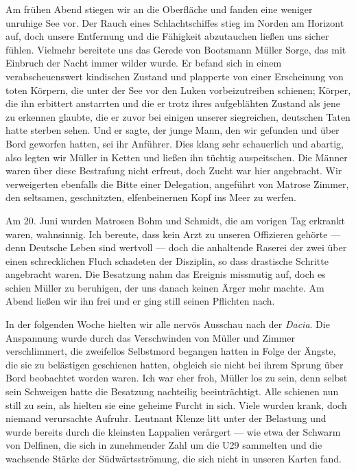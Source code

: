 \documentclass[a4paper]{memoir}
\begin{document}
Am frühen Abend stiegen wir an die Oberfläche und fanden eine weniger unruhige See vor. Der Rauch eines Schlachtschiffes stieg im Norden am Horizont auf, doch unsere Entfernung und die Fähigkeit abzutauchen ließen uns sicher fühlen. Vielmehr bereitete uns das Gerede von Bootsmann Müller Sorge, das mit Einbruch der Nacht immer wilder wurde. Er befand sich in einem verabscheuenswert kindischen Zustand und plapperte von einer Erscheinung von toten Körpern, die unter der See vor den Luken vorbeizutreiben schienen; Körper, die ihn erbittert anstarrten und die er trotz ihres aufgeblähten Zustand als jene zu erkennen glaubte, die er zuvor bei einigen unserer siegreichen, deutschen Taten hatte sterben sehen. Und er sagte, der junge Mann, den wir gefunden und über Bord geworfen hatten, sei ihr Anführer. Dies klang sehr schauerlich und abartig, also legten wir Müller in Ketten und ließen ihn tüchtig auspeitschen. Die Männer waren über diese Bestrafung nicht erfreut, doch Zucht war hier angebracht. Wir verweigerten ebenfalls die Bitte einer Delegation, angeführt von Matrose Zimmer, den seltsamen, geschnitzten, elfenbeinernen Kopf ins Meer zu werfen.

Am 20. Juni wurden Matrosen Bohm und Schmidt, die am vorigen Tag erkrankt waren, wahnsinnig. Ich bereute, dass kein Arzt zu unseren Offizieren gehörte --- denn Deutsche Leben sind wertvoll --- doch die anhaltende Raserei der zwei über einen schrecklichen Fluch schadeten der Disziplin, so dass drastische Schritte angebracht waren. Die Besatzung nahm das Ereignis missmutig auf, doch es schien Müller zu beruhigen, der uns danach keinen Ärger mehr machte. Am Abend ließen wir ihn frei und er ging still seinen Pflichten nach.

In der folgenden Woche hielten wir alle nervös Ausschau nach der \textit{Dacia}. Die Anspannung wurde durch das Verschwinden von Müller und Zimmer verschlimmert, die zweifellos Selbstmord begangen hatten in Folge der Ängste, die sie zu belästigen geschienen hatten, obgleich sie nicht bei ihrem Sprung über Bord beobachtet worden waren. Ich war eher froh, Müller los zu sein, denn selbst sein Schweigen hatte die Besatzung nachteilig beeinträchtigt. Alle schienen nun still zu sein, als hielten sie eine geheime Furcht in sich. Viele wurden krank, doch niemand verursachte Aufruhr. Leutnant Klenze litt unter der Belastung und wurde bereits durch die kleinsten Lappalien verärgert --- wie etwa der Schwarm von Delfinen, die sich in zunehmender Zahl um die U29 sammelten und die wachsende Stärke der Südwärtsströmung, die sich nicht in unseren Karten fand.
\end{document}
